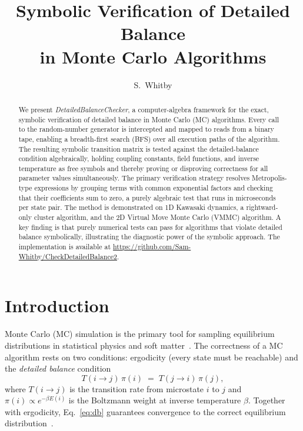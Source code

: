 \documentclass[twocolumn,10pt]{article}
\title{\textbf{Symbolic Verification of Detailed Balance\\[-2pt] in Monte Carlo Algorithms}}
\author{S.~Whitby}
\date{}
\begin{document}
\maketitle
\thispagestyle{empty}

\begin{abstract}
\noindent
We present \textit{DetailedBalanceChecker}, a computer-algebra framework for the
exact, symbolic verification of detailed balance in Monte Carlo (MC) algorithms.
Every call to the random-number generator is intercepted and mapped to reads from
a binary tape, enabling a breadth-first search (BFS) over all execution paths of
the algorithm.  The resulting symbolic transition matrix is tested against the
detailed-balance condition algebraically, holding coupling constants, field
functions, and inverse temperature as free symbols and thereby proving or
disproving correctness for all parameter values simultaneously.  The primary
verification strategy resolves Metropolis-type expressions by grouping terms with
common exponential factors and checking that their coefficients sum to zero, a
purely algebraic test that runs in microseconds per state pair.  The method is
demonstrated on 1D Kawasaki dynamics, a rightward-only cluster algorithm, and the
2D Virtual Move Monte Carlo (VMMC) algorithm.  A key finding is that purely
numerical tests can pass for algorithms that violate detailed balance symbolically,
illustrating the diagnostic power of the symbolic approach.  The implementation is
available at \url{https://github.com/Sam-Whitby/CheckDetailedBalance2}.
\end{abstract}

\section{Introduction}

Monte Carlo (MC) simulation is the primary tool for sampling equilibrium
distributions in statistical physics and soft
matter~\cite{Metropolis1953,Frenkel2002,Allen1987}.  The correctness of a MC
algorithm rests on two conditions: ergodicity (every state must be reachable) and
the \emph{detailed balance} condition
\begin{equation}
  T(i \to j)\,\pi(i) \;=\; T(j \to i)\,\pi(j),
  \label{eq:db}
\end{equation}
where $T(i\to j)$ is the transition rate from microstate $i$ to $j$ and
$\pi(i)\propto e^{-\beta E(i)}$ is the Boltzmann weight at inverse temperature
$\beta$.  Together with ergodicity, Eq.~\eqref{eq:db} guarantees convergence to
the correct equilibrium distribution~\cite{Levin2009}.
\end{document}
